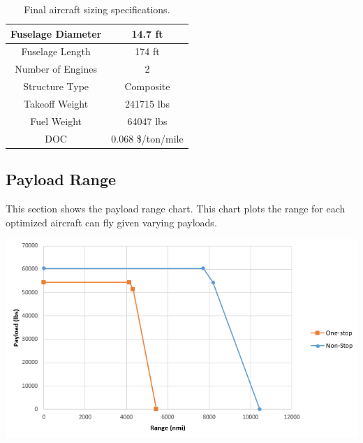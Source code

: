 \documentclass{article}
\begin{document}
\begin{table}[ht]
\begin{tabular}{|c|c|}
                \rowcolor[HTML]{C0C0C0}
                Fuselage Diameter                  & 14.7 ft                             \\ \hline
                \rowcolor[HTML]{FFFFFF}
                Fuselage Length                    & 174 ft                              \\ \hline
                \rowcolor[HTML]{C0C0C0}
                Number of Engines                  & 2                                   \\ \hline
                \rowcolor[HTML]{FFFFFF}
                Structure Type                     & Composite                           \\ \hline
                \rowcolor[HTML]{C0C0C0}
                Takeoff Weight                     & 241715 lbs                          \\ \hline
                \rowcolor[HTML]{FFFFFF}
                Fuel Weight                        & 64047 lbs                           \\ \hline
                \rowcolor[HTML]{C0C0C0}
                DOC                                & 0.068 \$/ton/mile                   \\ \hline
            \end{tabular}
        \caption{Final aircraft sizing specifications.}
        \end{table}



    \subsection{Payload Range}
    \label{sec:PR}
    \begin{flushleft}
        This section shows the payload range chart. This chart plots the range
        for each optimized aircraft can fly given varying payloads.
    \end{flushleft}

    \begin{center}
        \includegraphics[scale=0.6]{Payload Range.PNG}
        \label{fig:PR}
    \end{center}
\end{document}
